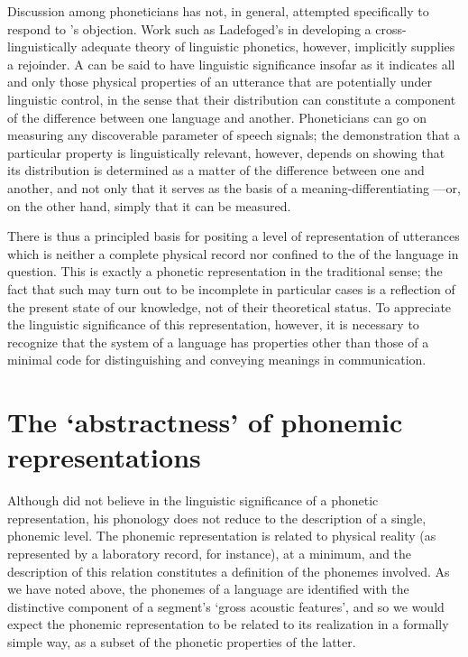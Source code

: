 Discussion among phoneticians has not, in general, attempted
specifically to respond to {\Bloomfield}'s objection. Work such as
Ladefoged's in developing a cross-linguistically adequate theory of
linguistic phonetics, however, implicitly supplies a rejoinder. A
 can be said to have linguistic significance
insofar as it indicates all and only those physical properties of an
utterance that are potentially under linguistic control, in the sense
that their distribution can constitute a component of the difference
between one language and another. Phoneticians can go on measuring any
discoverable parameter of speech signals; the demonstration that a
particular property is linguistically relevant, however, depends on
showing that its distribution is determined as a matter of the
difference between one  and another, and not only
that it serves as the basis of a meaning-differentiating —or,
on the other hand, simply that it can be measured.

There is thus a principled basis for positing a level of
representation of utterances which is neither a complete physical
record nor confined to the  of the language in
question. This is exactly a phonetic representation in the traditional
sense; the fact that such  may turn out to be
incomplete in particular cases is a reflection of the present state of
our knowledge, not of their theoretical status. To appreciate the
linguistic significance of this representation, however, it is
necessary to recognize that the system of a language has properties
other than those of a minimal code for distinguishing and conveying
meanings in communication.

\section{The `abstractness' of phonemic representations}

Although {\Bloomfield} did not believe in the linguistic significance of
a phonetic representation, his phonology does not reduce to the
description of a single, phonemic level. The phonemic representation
is related to physical reality (as represented by a laboratory record,
for instance), at a minimum, and the description of this relation
constitutes a definition of the phonemes involved. As we have noted
above, the phonemes of a language are identified with the distinctive
component of a segment's `gross acoustic features', and so we would
expect the phonemic representation to be related to its realization in
a formally simple way, as a subset of the phonetic properties of the
latter.


